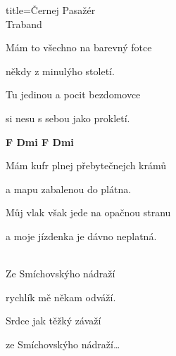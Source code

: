 \begin{song}{title=\centering Černej Pasažér \\\normalsize Traband \vspace*{-0.3cm}}
{\begin{minipage}[t]{0.48\textwidth}
\sloka
Mám to všechno na barevný fotce  

někdy z minulýho století. 

Tu jedinou a pocit bezdomovce 

si nesu s sebou jako prokletí.

\mezera
\textbf{F  Dmi F  Dmi }


\sloka
Mám kufr plnej přebytečnejch krámů 

a mapu zabalenou do plátna. 

Můj vlak však jede na opačnou stranu 

a moje jízdenka je dávno neplatná.

\\

Ze Smíchovskýho nádraží

rychlík mě někam odváží.

Srdce jak těžký závaží

ze Smíchovskýho nádraží\elipsa\dots

\end{minipage}   %
}
\end{song}
\setcounter{Slokočet}{0}
